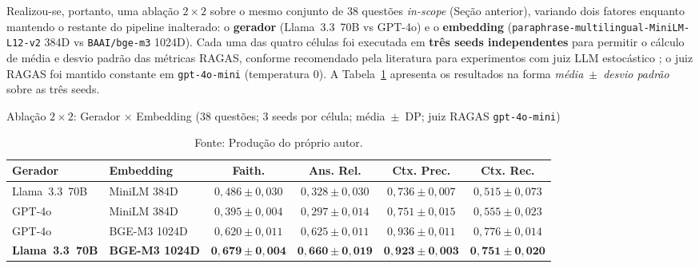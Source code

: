 \documentclass[
  12pt,
  oneside,
  a4paper,
  english,
  brazil
]{abntex2}
\begin{document}
Realizou-se, portanto, uma ablação $2 \times 2$ sobre o mesmo conjunto de 38
questões \textit{in-scope} (Seção anterior), variando dois fatores enquanto
mantendo o restante do pipeline inalterado: o \textbf{gerador}
(Llama~3.3~70B vs GPT-4o) e o \textbf{embedding}
(\texttt{paraphrase-multilingual-MiniLM-L12-v2} 384D vs \texttt{BAAI/bge-m3}
1024D). Cada uma das quatro células foi executada em \textbf{três seeds
independentes} para permitir o cálculo de média e desvio padrão das métricas
RAGAS, conforme recomendado pela literatura para experimentos com juiz LLM
estocástico \cite{es2024, ocaf2024}; o juiz RAGAS foi mantido constante em
\texttt{gpt-4o-mini} (temperatura 0). A Tabela~\ref{tab:ablacao-2x2}
apresenta os resultados na forma \textit{média}~$\pm$~\textit{desvio padrão}
sobre as três seeds.

\begin{table}[ht]
  \caption{Ablação $2 \times 2$: Gerador × Embedding (38 questões; 3 seeds
           por célula; média~$\pm$~DP; juiz RAGAS \texttt{gpt-4o-mini})}
  \label{tab:ablacao-2x2}
  \begin{tabularx}{\textwidth}{@{}lXcccc@{}}
  \toprule
  \textbf{Gerador} & \textbf{Embedding} &
  \textbf{Faith.} & \textbf{Ans. Rel.} & \textbf{Ctx. Prec.} & \textbf{Ctx. Rec.} \\
  \midrule
  Llama~3.3~70B & MiniLM 384D & $0{,}486 \pm 0{,}030$ & $0{,}328 \pm 0{,}030$ & $0{,}736 \pm 0{,}007$ & $0{,}515 \pm 0{,}073$ \\
  GPT-4o        & MiniLM 384D & $0{,}395 \pm 0{,}004$ & $0{,}297 \pm 0{,}014$ & $0{,}751 \pm 0{,}015$ & $0{,}555 \pm 0{,}023$ \\
  GPT-4o        & BGE-M3 1024D & $0{,}620 \pm 0{,}011$ & $0{,}625 \pm 0{,}011$ & $0{,}936 \pm 0{,}011$ & $0{,}776 \pm 0{,}014$ \\
  \textbf{Llama~3.3~70B} & \textbf{BGE-M3 1024D}
        & $\mathbf{0{,}679 \pm 0{,}004}$ & $\mathbf{0{,}660 \pm 0{,}019}$ & $\mathbf{0{,}923 \pm 0{,}003}$ & $\mathbf{0{,}751 \pm 0{,}020}$ \\
  \bottomrule
  \end{tabularx}
  \caption*{Fonte: Produção do próprio autor.}
\end{table}
\end{document}
